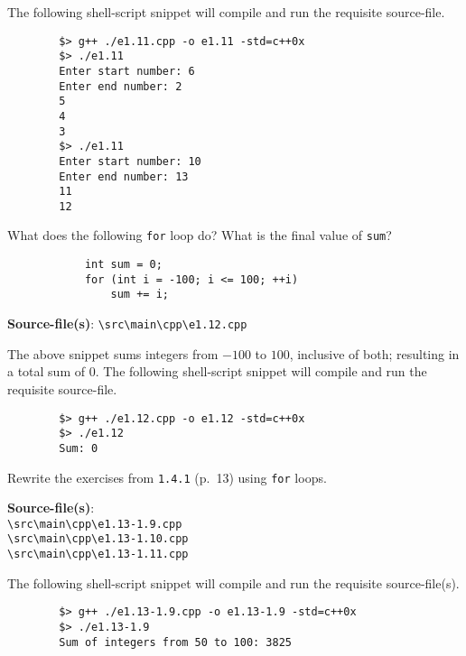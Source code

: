 \documentclass[12pt, a4paper]{article}
\begin{document}
    \noindent The following shell-script snippet will compile and run the requisite source-file.
    \begin{verbatim}
        $> g++ ./e1.11.cpp -o e1.11 -std=c++0x
        $> ./e1.11
        Enter start number: 6
        Enter end number: 2
        5
        4
        3
        $> ./e1.11
        Enter start number: 10
        Enter end number: 13
        11
        12
    \end{verbatim}

    \bigskip
    \begin{tcolorbox}[title={Exercise: 1.12}]
        What does the following \texttt{for} loop do?
        What is the final value of \texttt{sum}?
        \begin{verbatim}
            int sum = 0;
            for (int i = -100; i <= 100; ++i)
                sum += i;
        \end{verbatim}
    \end{tcolorbox}
    \noindent\textbf{Source-file(s)}: \texttt{\textbackslash src\textbackslash main\textbackslash cpp\textbackslash e1.12.cpp}

    \noindent The above snippet sums integers from $-100$ to $100$, inclusive of both; resulting in a total sum of $0$.
    The following shell-script snippet will compile and run the requisite source-file.
    \begin{verbatim}
        $> g++ ./e1.12.cpp -o e1.12 -std=c++0x
        $> ./e1.12
        Sum: 0
    \end{verbatim}

    \bigskip
    \begin{tcolorbox}[title={Exercise: 1.13}]
        Rewrite the exercises from \texttt{1.4.1} (p.~13) using \texttt{for} loops.
    \end{tcolorbox}
    \noindent\textbf{Source-file(s)}:
    \\ \texttt{\textbackslash src\textbackslash main\textbackslash cpp\textbackslash e1.13-1.9.cpp}
    \\ \texttt{\textbackslash src\textbackslash main\textbackslash cpp\textbackslash e1.13-1.10.cpp}
    \\ \texttt{\textbackslash src\textbackslash main\textbackslash cpp\textbackslash e1.13-1.11.cpp}

    \noindent The following shell-script snippet will compile and run the requisite source-file(s).
    \begin{verbatim}
        $> g++ ./e1.13-1.9.cpp -o e1.13-1.9 -std=c++0x
        $> ./e1.13-1.9
        Sum of integers from 50 to 100: 3825
    \end{verbatim}
\end{document}
